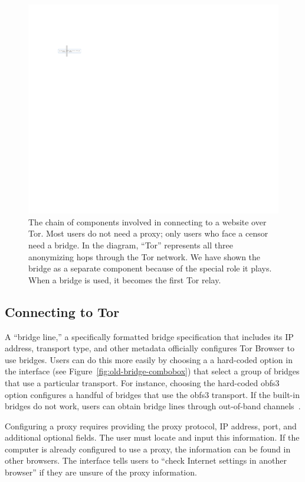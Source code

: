 \documentclass[USenglish,oneside,twocolumn]{article}
\begin{document}
\begin{figure}
\centering
\includegraphics{topology.pdf}
\caption{
The chain of components involved in connecting to a website over Tor.
Most users do not need a proxy;
only users who face a censor need a bridge.
In the diagram, ``Tor'' represents all three anonymizing hops through the Tor network.
We have shown the bridge as a separate component
because of the special role it plays.
When a bridge is used, it becomes the first Tor relay.
}
\label{fig:topology}
\end{figure}

\subsection{Connecting to Tor} 
A ``bridge line,'' a specifically formatted bridge specification that
includes its IP address, transport type, and other metadata 
officially configures Tor Browser to use bridges.
Users can do this more easily by choosing a 
a hard-coded option in the interface (see Figure~\ref{fig:old-bridge-combobox}) 
that select a group of bridges that use a particular transport.
For instance, choosing the hard-coded obfs3 option
configures a handful of bridges that use the obfs3 transport.
If the built-in bridges do not work, users can obtain bridge lines
through out-of-band channels~\cite{bridgedb}.

Configuring a proxy requires providing the proxy protocol, IP address, port, and additional optional fields. The user must locate and input this information. If the computer is already configured to use a proxy, the information can be found in other browsers. The interface tells users to ``check Internet settings in another browser'' if they are unsure of the proxy information. 
\end{document}
